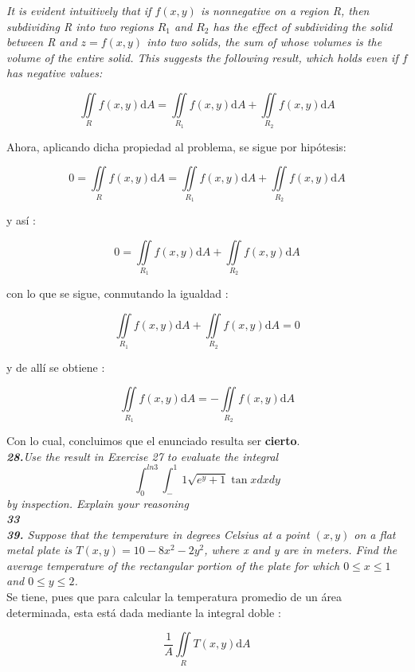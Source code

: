 \documentclass[a4paper,12pt]{article}
\begin{document}
	\textit{It is evident intuitively that if $f(x, y)$ is nonnegative on a
	region R, then subdividing R into two regions $R_1$ and $R_2$ has the effect
	of subdividing the solid between R and $z = f (x , y)$ into two solids,
	the sum of whose volumes is the volume of the entire solid. This suggests
	the following result, which holds even if $f$ has negative values:}

		$$ \iint\limits_{R} f(x,y)\mathrm{d}A
			= \iint\limits_{R_1} f(x,y)\mathrm{d}A + \iint\limits_{R_2} f(x,y)\mathrm{d}A  $$

	Ahora, aplicando dicha propiedad al problema, se sigue por hipótesis:

		$$ 0 = \iint\limits_{R} f(x,y)\mathrm{d}A
			= \iint\limits_{R_1} f(x,y)\mathrm{d}A + \iint\limits_{R_2} f(x,y)\mathrm{d}A  $$

	y así :

		$$ 0 = \iint\limits_{R_1} f(x,y)\mathrm{d}A + \iint\limits_{R_2} f(x,y)\mathrm{d}A  $$

	con lo que se sigue, conmutando la igualdad :

		$$ \iint\limits_{R_1} f(x,y)\mathrm{d}A + \iint\limits_{R_2} f(x,y)\mathrm{d}A = 0$$

	y de allí se obtiene :

		$$ \iint\limits_{R_1} f(x,y)\mathrm{d}A = - \iint\limits_{R_2} f(x,y)\mathrm{d}A $$

	Con lo cual, concluimos que el enunciado resulta ser \textbf{cierto}.\\

	\textit{\textbf{28.}Use the result in Exercise 27 to evaluate the integral
	\[\int^{ln 3}_{0} \int^1_-1 \sqrt{e^y + 1}\tan x dx dy\]
	by inspection. Explain your reasoning}\ \\

	\textit{\textbf{33}}\\

	\textit{\textbf{39.} Suppose that the temperature in degrees Celsius at a
	point $(x,y)$ on a flat metal plate is $ T(x,y)=10 - 8x^2 - 2y^2$, where x
	and y are in meters. Find the average temperature of the rectangular portion
	of the plate for which $0 \leq x \leq 1$ and $0 \leq y \leq 2$.}\\

	Se tiene, pues que para calcular la temperatura promedio de un área
	determinada, esta está dada mediante la integral doble :

		$$ \frac{1}{A}  \iint\limits_{R} T(x,y)\mathrm{d}A   $$
\end{document}
